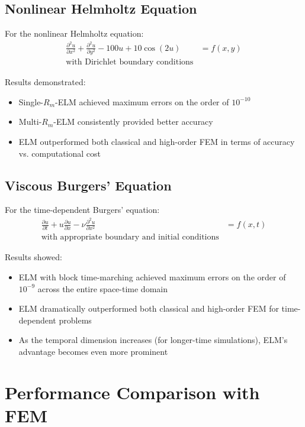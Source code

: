 \documentclass[11pt,a4paper]{article}
\begin{document}
\subsection{Nonlinear Helmholtz Equation}

For the nonlinear Helmholtz equation:
\begin{align}
    \frac{\partial^2 u}{\partial x^2} + \frac{\partial^2 u}{\partial y^2} - 100u + 10\cos(2u) &= f(x,y) \\
    \text{with Dirichlet boundary conditions}
\end{align}

Results demonstrated:
\begin{itemize}
    \item Single-$R_m$-ELM achieved maximum errors on the order of $10^{-10}$
    \item Multi-$R_m$-ELM consistently provided better accuracy
    \item ELM outperformed both classical and high-order FEM in terms of accuracy vs. computational cost
\end{itemize}

\subsection{Viscous Burgers' Equation}

For the time-dependent Burgers' equation:
\begin{align}
    \frac{\partial u}{\partial t} + u\frac{\partial u}{\partial x} - \nu\frac{\partial^2 u}{\partial x^2} &= f(x,t) \\
    \text{with appropriate boundary and initial conditions}
\end{align}

Results showed:
\begin{itemize}
    \item ELM with block time-marching achieved maximum errors on the order of $10^{-9}$ across the entire space-time domain
    \item ELM dramatically outperformed both classical and high-order FEM for time-dependent problems
    \item As the temporal dimension increases (for longer-time simulations), ELM's advantage becomes even more prominent
\end{itemize}

\section{Performance Comparison with FEM}
\end{document}
